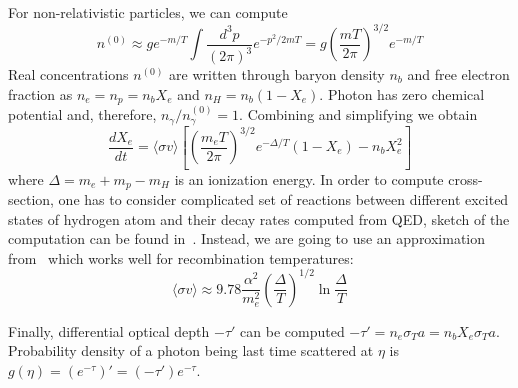\documentclass[12pt]{extarticle}
\numberwithin{problem}{section}
\numberwithin{theorem}{section}
\begin{document}
	For non-relativistic particles, we can compute
	\begin{equation}
		n^{(0)} \approx ge^{-m/T}\int\frac{d^3p}{(2\pi)^3}e^{-p^2/2mT} = g\left(\frac{mT}{2\pi}\right)^{3/2}e^{-m/T}
	\end{equation}
	Real concentrations $n^{(0)}$ are written through baryon density $n_b$ and free electron fraction as $n_e = n_p = n_b X_e$ and $n_H = n_b (1 - X_e)$. Photon has zero chemical potential and, therefore, $n_\gamma/n_\gamma^{(0)} = 1$. Combining and simplifying we obtain
	\begin{equation}
		\frac{dX_e}{dt} = \langle\sigma v\rangle\left[\left(\frac{m_eT}{2\pi}\right)^{3/2}e^{-\Delta/T}(1 - X_e) - n_b X_e^2\right]
	\end{equation}
	where $\Delta = m_e + m_p - m_H$ is an ionization energy. In order to compute cross-section, one has to consider complicated set of reactions between different excited states of hydrogen atom and their decay rates computed from QED, sketch of the computation can be found in~\cite{peebles:1993}. Instead, we are going to use an approximation from~\cite{ma:1995} which works well for recombination temperatures:
	\begin{equation}
		\langle\sigma v\rangle\approx 9.78\frac{\alpha^2}{m_e^2}\left(\frac{\Delta}{T}\right)^{1/2}\ln\frac{\Delta}{T}
	\end{equation}

	Finally, differential optical depth $-\tau'$ can be computed $-\tau' = n_e\sigma_Ta = n_bX_e\sigma_Ta$. Probability density of a photon being last time scattered at $\eta$ is $g(\eta) = (e^{-\tau})' = (-\tau')e^{-\tau}$. 
	
\end{document}
